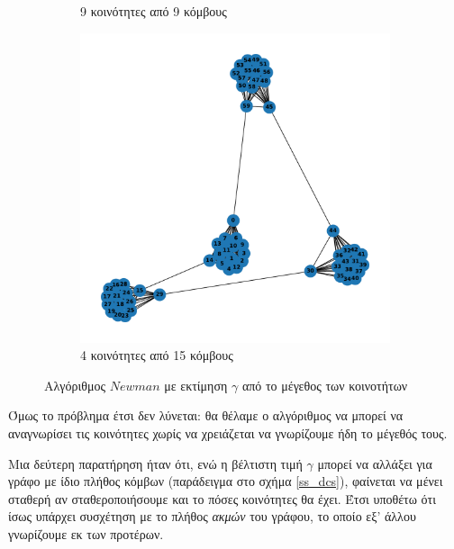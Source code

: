 \documentclass[10pt, letterpaper]{article}
\begin{document}
\begin{figure}[h]
\begin{subfigure}{0.3\textwidth}
      \caption{9 κοινότητες από 9 κόμβους}
      \label{9b}
  \end{subfigure}
  \begin{subfigure}{0.3\textwidth}
      \includegraphics[width=\textwidth]{cluster_4,15newman_auto.pdf}
      \caption{4 κοινότητες από 15 κόμβους}
      \label{9c}
  \end{subfigure}
  \caption{Αλγόριθμος $Newman$ με εκτίμηση $\gamma$ από το μέγεθος των κοινοτήτων}
  \label{auto_cluster_size}
\end{figure}







Όμως το πρόβλημα έτσι δεν λύνεται: θα θέλαμε ο αλγόριθμος να μπορεί να αναγνωρίσει 
τις κοινότητες χωρίς να χρειάζεται να γνωρίζουμε ήδη το μέγεθός τους. 


Μια δεύτερη παρατήρηση ήταν ότι, ενώ η βέλτιστη τιμή $\gamma$ μπορεί να αλλάξει για γράφο 
με ίδιο πλήθος κόμβων (παράδειγμα στο σχήμα \ref{ss_dcs}), φαίνεται να μένει σταθερή αν σταθεροποιήσουμε και το πόσες 
κοινότητες θα έχει. Έτσι υποθέτω ότι ίσως υπάρχει συσχέτηση με το πλήθος \emph{ακμών} του γράφου,
το οποίο εξ' άλλου γνωρίζουμε εκ των προτέρων. 
\end{document}
